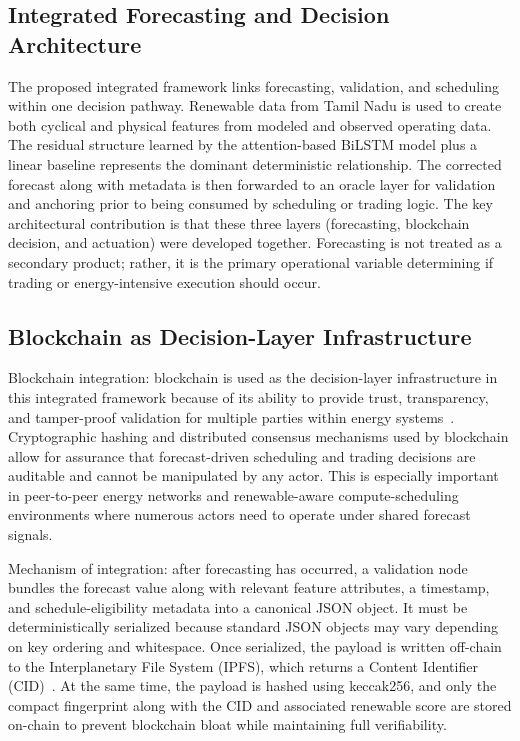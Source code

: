 \documentclass{ieeeaccess}
\begin{document}
\subsection{Integrated Forecasting and Decision Architecture}
The proposed integrated framework links forecasting, validation, and scheduling within one decision pathway. Renewable data from Tamil Nadu is used to create both cyclical and physical features from modeled and observed operating data. The residual structure learned by the attention-based BiLSTM model plus a linear baseline represents the dominant deterministic relationship. The corrected forecast along with metadata is then forwarded to an oracle layer for validation and anchoring prior to being consumed by scheduling or trading logic. The key architectural contribution is that these three layers (forecasting, blockchain decision, and actuation) were developed together. Forecasting is not treated as a secondary product; rather, it is the primary operational variable determining if trading or energy-intensive execution should occur.

\subsection{Blockchain as Decision-Layer Infrastructure}
Blockchain integration: blockchain is used as the decision-layer infrastructure in this integrated framework because of its ability to provide trust, transparency, and tamper-proof validation for multiple parties within energy systems~\cite{blockchain_dispatch_access}. Cryptographic hashing and distributed consensus mechanisms used by blockchain allow for assurance that forecast-driven scheduling and trading decisions are auditable and cannot be manipulated by any actor. This is especially important in peer-to-peer energy networks and renewable-aware compute-scheduling environments where numerous actors need to operate under shared forecast signals.

Mechanism of integration: after forecasting has occurred, a validation node bundles the forecast value along with relevant feature attributes, a timestamp, and schedule-eligibility metadata into a canonical JSON object. It must be deterministically serialized because standard JSON objects may vary depending on key ordering and whitespace. Once serialized, the payload is written off-chain to the Interplanetary File System (IPFS), which returns a Content Identifier (CID)~\cite{ipfs_blockchain_access}. At the same time, the payload is hashed using keccak256, and only the compact fingerprint along with the CID and associated renewable score are stored on-chain to prevent blockchain bloat while maintaining full verifiability.
\end{document}
